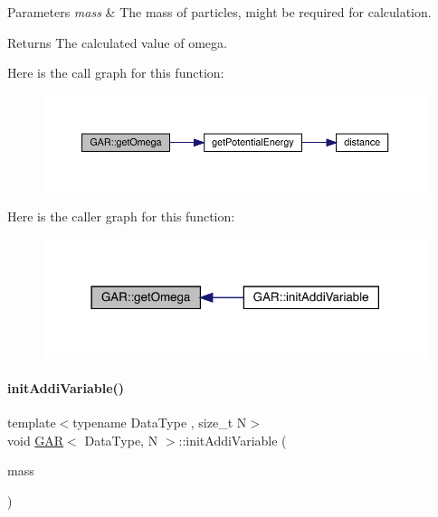 \begin{DoxyParams}{Parameters}
{\em mass} & The mass of particles, might be required for calculation. \\
\hline
\end{DoxyParams}
\begin{DoxyReturn}{Returns}
The calculated value of omega. 
\end{DoxyReturn}
Here is the call graph for this function\+:\nopagebreak
\begin{figure}[H]
\begin{center}
\leavevmode
\includegraphics[width=350pt]{class_g_a_r_a3d5871f25d147497399fa65343bca84a_cgraph}
\end{center}
\end{figure}
Here is the caller graph for this function\+:\nopagebreak
\begin{figure}[H]
\begin{center}
\leavevmode
\includegraphics[width=318pt]{class_g_a_r_a3d5871f25d147497399fa65343bca84a_icgraph}
\end{center}
\end{figure}
\mbox{\label{class_g_a_r_a31b5ad2527cc52d1422fa11e2d93fbc6}} 
\paragraph{\texorpdfstring{init\+Addi\+Variable()}{initAddiVariable()}}
{\footnotesize\ttfamily template$<$typename Data\+Type , size\+\_\+t N$>$ \\
void \mbox{\hyperlink{class_g_a_r}{G\+AR}}$<$ Data\+Type, N $>$\+::init\+Addi\+Variable (\begin{DoxyParamCaption}\item[{\mbox{\hyperlink{class_g_a_r_a0b446684ae922457a3bf86c904085d8a}{Scalar\+Array}} \&}]{mass }\end{DoxyParamCaption})\hspace{0.3cm}{\ttfamily [inline]}}



